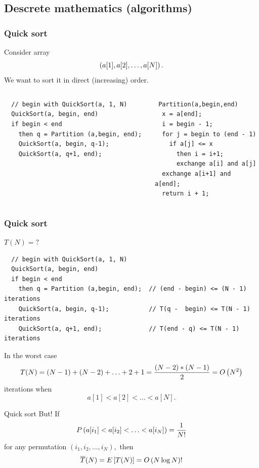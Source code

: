 \documentclass[12pt]{beamer}
\begin{document}
\subsection*{Descrete mathematics (algorithms)}
\begin{frame}[fragile] \frametitle{Quick sort}
Consider array $$\left(a[1], a[2], \ldots, a[N]\right).$$ We want to sort it in direct (increasing) order.
{
\scriptsize
\begin{columns}
\begin{column}{5cm}
\begin{verbatim}
  // begin with QuickSort(a, 1, N)
  QuickSort(a, begin, end) 
  if begin < end
    then q = Partition (a,begin, end); 
    QuickSort(a, begin, q-1);
    QuickSort(a, q+1, end);
\end{verbatim}
\end{column}

\begin{column}{5cm}
 \begin{verbatim}
 Partition(a,begin,end)
  x = a[end];
  i = begin - 1;
  for j = begin to (end - 1)
    if a[j] <= x
      then i = i+1;
      exchange a[i] and a[j]
  exchange a[i+1] and a[end];
  return i + 1;
\end{verbatim}
\end{column}

\end{columns}
}
\end{frame}

\begin{frame}[fragile] \frametitle{Quick sort}
{
\small
$T(N) = ?$
{
\scriptsize
\begin{verbatim}
  // begin with QuickSort(a, 1, N)
  QuickSort(a, begin, end) 
  if begin < end
    then q = Partition (a,begin, end);  // (end - begin) <= (N - 1) iterations
    QuickSort(a, begin, q-1);           // T(q -  begin) <= T(N - 1) iterations
    QuickSort(a, q+1, end);             // T(end - q) <= T(N - 1) iterations
\end{verbatim}
}
In the worst case $$T(N) = (N-1) + (N - 2) + \ldots + 2 + 1 = \frac{(N -2)* (N-1)}{2} = O\left(N^2\right)$$ 
iterations when 
$$a[1] < a[2] < \ldots < a[N].$$
}
\end{frame}

\begin{frame}{Quick sort}
But! If 
$$P\left(a[i_1] < a[i_2] < \ldots < a[i_N]\right) = \frac{1}{N!}$$ for any permutation $(i_1,i_2,\ldots,i_N),$
then
$$\overline{T}(N) = E\left[T(N)\right] = O\left(N \log{N}\right)!$$
\end{frame}
\end{document}
